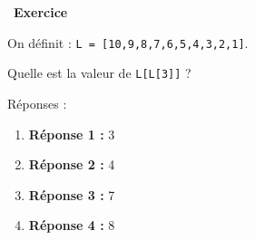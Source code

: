 \documentclass[
  11pt,
]{article}
\newcommand{\passthrough}[1]{#1}
\newcounter{exo}
\newenvironment{exercice}[1]
{\par \medskip   \addtocounter{exo}{1} \noindent  
\begin{bclogo}[arrondi =0.1,   noborder = true, logo=\bccrayon, marge=4]{~\textbf{Exercice} \textbf{\theexo} {\itshape #1} }  \par}
{
\end{bclogo}
 \par \bigskip }
\newcounter{def}
\begin{document}
\begin{exercice}{}

On définit : \passthrough{\lstinline!L = [10,9,8,7,6,5,4,3,2,1]!}.

Quelle est la valeur de \passthrough{\lstinline!L[L[3]]!} ?

Réponses :

\begin{enumerate}
\def\labelenumi{\arabic{enumi}.}
\item
  \textbf{Réponse 1 :} 3
\item
  \textbf{Réponse 2 :} 4
\item
  \textbf{Réponse 3 :} 7
\item
  \textbf{Réponse 4 :} 8
\end{enumerate}

\end{exercice}
\end{document}
